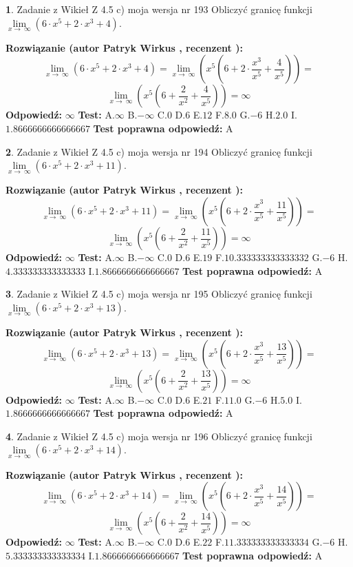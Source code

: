 \documentclass[12pt, a4paper]{article}
\theoremstyle{definition} %
\newtheorem{zad}{}
\newcommand{\zadStart}[1]{\begin{zad}#1\newline}
\newcommand{\zadStop}{\end{zad}}
\newcommand{\rozwStart}[2]{\noindent \textbf{Rozwiązanie (autor #1 , recenzent #2): }\newline}
\newcommand{\rozwStop}{\newline}
\newcommand{\odpStart}{\noindent \textbf{Odpowiedź:}\newline}
\newcommand{\odpStop}{\newline}
\newcommand{\testStart}{\noindent \textbf{Test:}\newline}
\newcommand{\testStop}{\newline}
\newcommand{\kluczStart}{\noindent \textbf{Test poprawna odpowiedź:}\newline}
\newcommand{\kluczStop}{\newline}
\begin{document}
\zadStart{Zadanie z Wikieł Z 4.5 c) moja wersja nr 193}
Obliczyć granicę funkcji  $\lim\limits_{x\to\ \infty}(6 \cdot x^{5}+2 \cdot x^{3}+4)$.
\zadStop
\rozwStart{Patryk Wirkus}{}
$$\lim\limits_{x\to\ \infty}(6 \cdot x^{5}+2 \cdot x^{3}+4) = \lim\limits_{x\to\ \infty}(x^{5}(6 +2 \cdot \frac{x^{3}}{x^{5}}+\frac{4}{x^{5}})) =$$ $$\lim\limits_{x\to\ \infty}(x^{5}(6 +\frac{2}{x^{2}}+\frac{4}{x^{5}})) =\infty$$
\rozwStop
\odpStart
$\infty$
\odpStop
\testStart
A.$\infty$ B.$-\infty$ C.$0$ D.$6$ E.$12$
F.$8.0$ G.$-6$
H.$2.0$
I.$1.8666666666666667$
\testStop
\kluczStart
A
\kluczStop



\zadStart{Zadanie z Wikieł Z 4.5 c) moja wersja nr 194}
Obliczyć granicę funkcji  $\lim\limits_{x\to\ \infty}(6 \cdot x^{5}+2 \cdot x^{3}+11)$.
\zadStop
\rozwStart{Patryk Wirkus}{}
$$\lim\limits_{x\to\ \infty}(6 \cdot x^{5}+2 \cdot x^{3}+11) = \lim\limits_{x\to\ \infty}(x^{5}(6 +2 \cdot \frac{x^{3}}{x^{5}}+\frac{11}{x^{5}})) =$$ $$\lim\limits_{x\to\ \infty}(x^{5}(6 +\frac{2}{x^{2}}+\frac{11}{x^{5}})) =\infty$$
\rozwStop
\odpStart
$\infty$
\odpStop
\testStart
A.$\infty$ B.$-\infty$ C.$0$ D.$6$ E.$19$
F.$10.333333333333332$ G.$-6$
H.$4.333333333333333$
I.$1.8666666666666667$
\testStop
\kluczStart
A
\kluczStop



\zadStart{Zadanie z Wikieł Z 4.5 c) moja wersja nr 195}
Obliczyć granicę funkcji  $\lim\limits_{x\to\ \infty}(6 \cdot x^{5}+2 \cdot x^{3}+13)$.
\zadStop
\rozwStart{Patryk Wirkus}{}
$$\lim\limits_{x\to\ \infty}(6 \cdot x^{5}+2 \cdot x^{3}+13) = \lim\limits_{x\to\ \infty}(x^{5}(6 +2 \cdot \frac{x^{3}}{x^{5}}+\frac{13}{x^{5}})) =$$ $$\lim\limits_{x\to\ \infty}(x^{5}(6 +\frac{2}{x^{2}}+\frac{13}{x^{5}})) =\infty$$
\rozwStop
\odpStart
$\infty$
\odpStop
\testStart
A.$\infty$ B.$-\infty$ C.$0$ D.$6$ E.$21$
F.$11.0$ G.$-6$
H.$5.0$
I.$1.8666666666666667$
\testStop
\kluczStart
A
\kluczStop



\zadStart{Zadanie z Wikieł Z 4.5 c) moja wersja nr 196}
Obliczyć granicę funkcji  $\lim\limits_{x\to\ \infty}(6 \cdot x^{5}+2 \cdot x^{3}+14)$.
\zadStop
\rozwStart{Patryk Wirkus}{}
$$\lim\limits_{x\to\ \infty}(6 \cdot x^{5}+2 \cdot x^{3}+14) = \lim\limits_{x\to\ \infty}(x^{5}(6 +2 \cdot \frac{x^{3}}{x^{5}}+\frac{14}{x^{5}})) =$$ $$\lim\limits_{x\to\ \infty}(x^{5}(6 +\frac{2}{x^{2}}+\frac{14}{x^{5}})) =\infty$$
\rozwStop
\odpStart
$\infty$
\odpStop
\testStart
A.$\infty$ B.$-\infty$ C.$0$ D.$6$ E.$22$
F.$11.333333333333334$ G.$-6$
H.$5.333333333333334$
I.$1.8666666666666667$
\testStop
\kluczStart
A
\kluczStop
\end{document}
